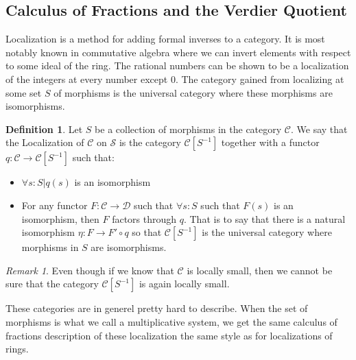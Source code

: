 \documentclass[11pt]{article}
\theoremstyle{definition}
\newtheorem{definition}{Definition}[section]
\theoremstyle{remark}
\newtheorem*{remark}{Remark}
\begin{document}
        \subsection{Calculus of Fractions and the Verdier Quotient}
            Localization is a method for adding formal inverses to a category. It is most notably known in commutative algebra where we can invert elements with respect to some ideal of the ring. The rational numbers can be shown to be a localization of the integers at every number except 0. The category gained from localizing at some set $S$ of morphisms is the universal category where these morphisms are isomorphisms.
            \begin{definition}
                Let $S$ be a collection of morphisms in the category $\mathcal{C}$. We say that the Localization of $\mathcal{C}$ on $\mathcal{S}$ is the category $\mathcal{C}[S^{-1}]$ together with a functor $q:\mathcal{C}\rightarrow \mathcal{C}[S^{-1}]$ such that:
                \begin{itemize}
                    \item $\forall s:S|q(s)$ is an isomorphism
                    \item For any functor $F:\mathcal{C}\rightarrow\mathcal{D}$ such that $\forall s:S$ such that $F(s)$ is an isomorphism, then $F$ factors through $q$. That is to say that there is a natural isomorphism $\eta : F\rightarrow F'\circ q$ so that $\mathcal{C}[S^{-1}]$ is the universal category where morphisms in $S$ are isomorphisms.
                \end{itemize}
                \begin{center}
                \end{center}
            \end{definition}

            \begin{remark}
                Even though if we know that $\mathcal{C}$ is locally small, then we cannot be sure that the category $\mathcal{C}[S^{-1}]$ is again locally small.
            \end{remark}

            These categories are in generel pretty hard to describe. When the set of morphisms is what we call a multiplicative system, we get the same calculus of fractions description of these localization the same style as for localizations of rings.
\end{document}
